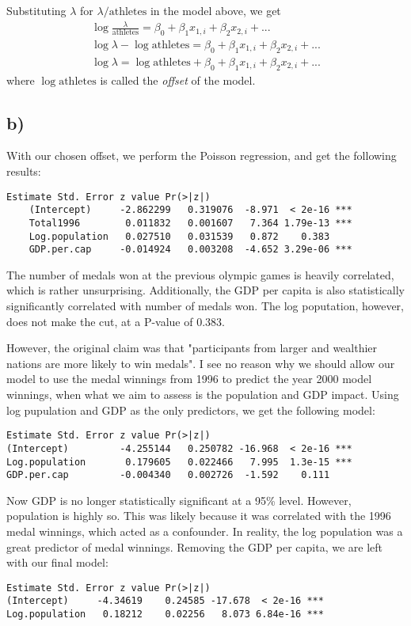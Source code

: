 \documentclass[a4paper, twocolumn]{article}
\begin{document}
Substituting $\lambda$ for $\lambda/\mathrm{athletes}$ in the model above, we get
\begin{align}
    \log{\frac{\lambda}{\mathrm{athletes}}} = \beta_0 + \beta_1 x_{1,i} + \beta_2 x_{2,i} + ... \\
    \log{\lambda} - \log{\mathrm{athletes}} = \beta_0 + \beta_1 x_{1,i} + \beta_2 x_{2,i} + ... \\
    \log{\lambda} = \log{\mathrm{athletes}} + \beta_0 + \beta_1 x_{1,i} + \beta_2 x_{2,i} + ...
\end{align}
where $\log{\mathrm{athletes}}$ is called the \textit{offset} of the model.



\subsection*{b)}
With our chosen offset, we perform the Poisson regression, and get the following results:
\begin{Verbatim}[fontsize=\scriptsize]
                    Estimate Std. Error z value Pr(>|z|)    
    (Intercept)     -2.862299   0.319076  -8.971  < 2e-16 ***
    Total1996        0.011832   0.001607   7.364 1.79e-13 ***
    Log.population   0.027510   0.031539   0.872    0.383    
    GDP.per.cap     -0.014924   0.003208  -4.652 3.29e-06 ***
\end{Verbatim}
The number of medals won at the previous olympic games is heavily correlated, which is rather unsurprising. Additionally, the GDP per capita is also statistically significantly correlated with number of medals won. The log poputation, however, does not make the cut, at a P-value of $0.383$.

However, the original claim was that "participants from larger and wealthier nations are more likely to win medals". I see no reason why we should allow our model to use the medal winnings from 1996 to predict the year 2000 model winnings, when what we aim to assess is the population and GDP impact. Using log pupulation and GDP as the only predictors, we get the following model:
\begin{Verbatim}[fontsize=\scriptsize]
                    Estimate Std. Error z value Pr(>|z|)    
(Intercept)         -4.255144   0.250782 -16.968  < 2e-16 ***
Log.population       0.179605   0.022466   7.995  1.3e-15 ***
GDP.per.cap         -0.004340   0.002726  -1.592    0.111  
\end{Verbatim}
Now GDP is no longer statistically significant at a 95\% level. However, population is highly so. This was likely because it was correlated with the 1996 medal winnings, which acted as a confounder. In reality, the log population was a great predictor of medal winnings. Removing the GDP per capita, we are left with our final model:
\begin{Verbatim}[fontsize=\scriptsize]
                Estimate Std. Error z value Pr(>|z|)    
(Intercept)     -4.34619    0.24585 -17.678  < 2e-16 ***
Log.population   0.18212    0.02256   8.073 6.84e-16 ***
\end{Verbatim}
\end{document}
